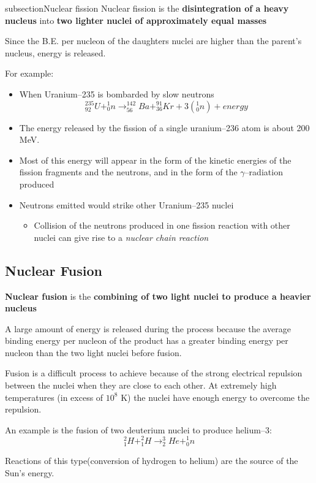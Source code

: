 subsection{Nuclear fission}
Nuclear fission is the \textbf{disintegration of a heavy nucleus} into \textbf{two lighter nuclei of approximately equal masses}

Since the B.E. per nucleon of the daughters nuclei are higher than the parent's nucleus, energy is released.

For example:
\begin{itemize}
\item When Uranium--235 is bombarded by slow neutrons
$$_{92}^{235}U +_0^1 n \rightarrow _{56}^{142} Ba + _{36}^{91} Kr + 3(_0^1 n) + energy$$
\item The energy released by the fission of a single uranium--236 atom is about 200 MeV.
\item Most of this energy will appear in the form of the kinetic energies of the fission fragments and the neutrons, and in the form of the $\gamma$--radiation produced
\item Neutrons emitted would strike other Uranium--235 nuclei
\begin{itemize}
\item Collision of the neutrons produced in one fission reaction with other nuclei can give rise to a \emph{nuclear chain reaction}
\end{itemize}
\end{itemize}

\subsection{Nuclear Fusion}
\textbf{Nuclear fusion} is the \textbf{combining of two light nuclei to produce a heavier nucleus}

A large amount of energy is released during the process because the average binding energy per nucleon of the product has a greater binding energy per nucleon than the two light nuclei before fusion.

Fusion is a difficult process to achieve because of the strong electrical repulsion between the nuclei when they are close to each other. At extremely high temperatures (in excess of $10^8$ K) the nuclei have enough energy to overcome the repulsion.

An example is the fusion of two deuterium nuclei to produce helium--3:
$$_1^2H + _1^2 H \rightarrow _2^3He + _0^1 n$$

Reactions of this type(conversion of hydrogen to helium) are the source of the Sun's energy.

